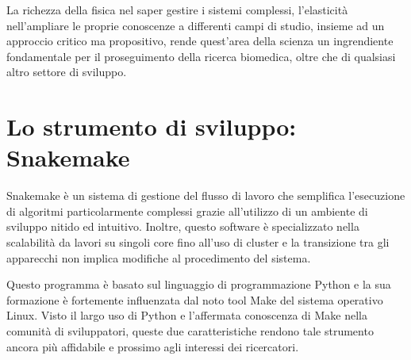 La richezza della fisica nel saper gestire i sistemi complessi, l'elasticità nell'ampliare le proprie conoscenze a differenti campi di studio, insieme ad un approccio critico ma propositivo, rende quest'area della scienza un ingrendiente fondamentale per il proseguimento della ricerca biomedica, oltre che di qualsiasi altro settore di sviluppo.

\section{Lo strumento di sviluppo: Snakemake}
Snakemake è un sistema di gestione del flusso di lavoro che semplifica l'esecuzione di algoritmi particolarmente complessi grazie all'utilizzo di un ambiente di sviluppo nitido ed intuitivo.
Inoltre, questo software è specializzato nella scalabilità da lavori su singoli core fino all'uso di cluster e la transizione tra gli apparecchi non implica modifiche al procedimento del sistema.

Questo programma è basato sul linguaggio di programmazione Python e la sua formazione è fortemente influenzata dal noto tool Make del sistema operativo Linux.
Visto il largo uso di Python e l'affermata conoscenza di Make nella comunità di sviluppatori, queste due caratteristiche rendono tale strumento ancora più affidabile e prossimo agli interessi dei ricercatori.

